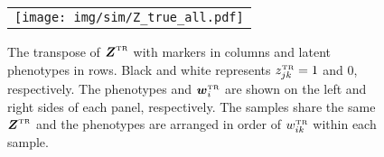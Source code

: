 \documentclass[12pt,]{article}
\newcommand{\true}{{\mbox{\tiny TR}}}
\newcommand{\bZ}{\mbox{\boldmath $Z$}}
\newcommand{\bw}{\mbox{\boldmath $w$}}
\begin{document}
\begin{figure}[t!]
  \begin{center}
\begin{tabular}{c}
\texttt{[image: img/sim/Z\_true\_all.pdf]}
  \end{tabular}
 \end{center}
 \vspace{-0.05in}
\caption{The transpose of $\bZ^\true$ with markers in columns and latent
phenotypes in rows. Black and white represents $z^\true_{jk}=1$ and 0,
respectively. The phenotypes and $\bw^\true_i$ are shown on the left and
right sides of each panel, respectively. The samples share the same $\bZ^\true$ and the phenotypes are arranged in order of
$w_{ik}^\true$ within each sample.}
\label{fig:sim-Z}
\end{figure}
\end{document}
